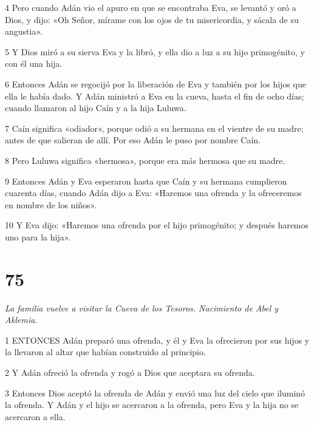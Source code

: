\par 4 Pero cuando Adán vio el apuro en que se encontraba Eva, se levantó y oró a Dios, y dijo: «Oh Señor, mírame con los ojos de tu misericordia, y sácala de su angustia».

\par 5 Y Dios miró a su sierva Eva y la libró, y ella dio a luz a su hijo primogénito, y con él una hija.

\par 6 Entonces Adán se regocijó por la liberación de Eva y también por los hijos que ella le había dado. Y Adán ministró a Eva en la cueva, hasta el fin de ocho días; cuando llamaron al hijo Caín y a la hija Luluwa.

\par 7 Caín significa «odiador», porque odió a su hermana en el vientre de su madre; antes de que salieran de allí. Por eso Adán le puso por nombre Caín.

\par 8 Pero Luluwa significa «hermosa», porque era más hermosa que su madre.

\par 9 Entonces Adán y Eva esperaron hasta que Caín y su hermana cumplieron cuarenta días, cuando Adán dijo a Eva: «Haremos una ofrenda y la ofreceremos en nombre de los niños».

\par 10 Y Eva dijo: «Haremos una ofrenda por el hijo primogénito; y después haremos uno para la hija».

\chapter{75}

\par \textit{La familia vuelve a visitar la Cueva de los Tesoros. Nacimiento de Abel y Aklemia.}

\par 1 ENTONCES Adán preparó una ofrenda, y él y Eva la ofrecieron por sus hijos y la llevaron al altar que habían construido al principio.

\par 2 Y Adán ofreció la ofrenda y rogó a Dios que aceptara su ofrenda.

\par 3 Entonces Dios aceptó la ofrenda de Adán y envió una luz del cielo que iluminó la ofrenda. Y Adán y el hijo se acercaron a la ofrenda, pero Eva y la hija no se acercaron a ella.

